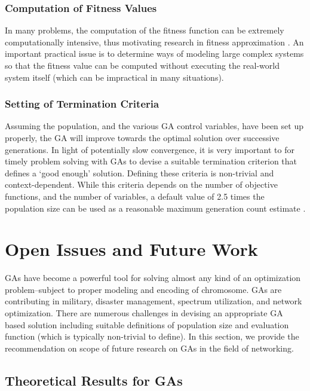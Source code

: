 \documentclass[journal]{IEEEtran}
\begin{document}
\vspace{2mm}
\subsubsection{Computation of Fitness Values}

In many problems, the computation of the fitness function can be extremely computationally intensive, thus motivating research in fitness approximation \cite{jin2005comprehensive}. An important practical issue is to determine ways of modeling large complex systems so that the fitness value can be computed without executing the real-world system itself (which can be impractical in many situations). 

\vspace{2mm}
\subsubsection{Setting of Termination Criteria}

Assuming the population, and the various GA control variables, have been set up properly, the GA will improve towards the optimal solution over successive generations. In light of potentially slow convergence, it is very important to for timely problem solving with GAs to devise a suitable termination criterion that defines a `good enough' solution. Defining these criteria is non-trivial and context-dependent. While this criteria depends on the number of objective functions, and the number of variables, a default value of 2.5 times the population size can be used as a reasonable maximum generation count estimate \cite{cox2005fuzzy}. 

\section{Open Issues and Future Work}
\label{sec:openissues}

GAs have become a powerful tool for solving almost any kind of an optimization problem--subject to proper modeling and encoding of chromosome. GAs are contributing in military, disaster management, spectrum utilization, and network optimization. There are numerous challenges in devising an appropriate GA based solution including suitable definitions of population size and evaluation function (which is typically non-trivial to define). In this section, we provide the recommendation on scope of future research on GAs in the field of networking. 

\subsection{Theoretical Results for GAs}
\end{document}
